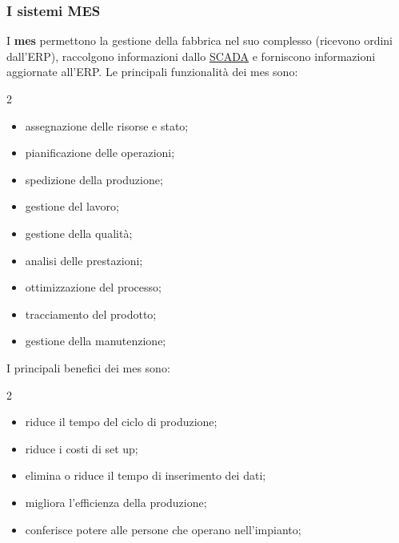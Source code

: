 \subsubsection{I sistemi MES}\label{sub:i_sistemi_mes} %
I \textbf{\ac{mes}} permettono la gestione della fabbrica nel suo complesso (ricevono ordini dall'ERP), raccolgono informazioni dallo \hyperref[def:scada]{SCADA} e forniscono informazioni aggiornate all'ERP.
Le principali funzionalità dei \ac{mes} sono:
\begin{multicols}{2}
    \begin{itemize}
        \item assegnazione delle risorse e stato;
        \item pianificazione delle operazioni;
        \item spedizione della produzione;
        \item gestione del lavoro;
        \item gestione della qualità;
        \item analisi delle prestazioni;
        \item ottimizzazione del processo;
        \item tracciamento del prodotto;
        \item gestione della manutenzione;
    \end{itemize}
\end{multicols}
I principali benefici dei \ac{mes} sono:
\begin{multicols}{2}
    \begin{itemize}
        \item riduce il tempo del ciclo di produzione;
        \item riduce i costi di set up;
        \item elimina o riduce il tempo di inserimento dei dati;
        \columnbreak
        \item migliora l'efficienza della produzione;
        \item conferisce potere alle persone che operano nell'impianto;
    \end{itemize}
\end{multicols}
%
